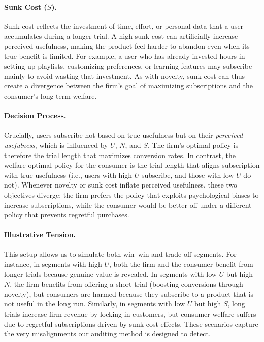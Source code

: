 \documentclass[11pt,letterpaper,english]{article}
\begin{document}
\paragraph{Sunk Cost ($S$).} Sunk cost reflects the investment of time, effort, or personal data that a user accumulates during a longer trial. A high sunk cost can artificially increase perceived usefulness, making the product feel harder to abandon even when its true benefit is limited. For example, a user who has already invested hours in setting up playlists, customizing preferences, or learning features may subscribe mainly to avoid wasting that investment. As with novelty, sunk cost can thus create a divergence between the firm’s goal of maximizing subscriptions and the consumer’s long-term welfare.

\paragraph{Decision Process.} Crucially, users subscribe not based on true usefulness but on their \emph{perceived usefulness}, which is influenced by $U$, $N$, and $S$. The firm’s optimal policy is therefore the trial length that maximizes conversion rates. In contrast, the welfare-optimal policy for the consumer is the trial length that aligns subscription with true usefulness (i.e., users with high $U$ subscribe, and those with low $U$ do not). Whenever novelty or sunk cost inflate perceived usefulness, these two objectives diverge: the firm prefers the policy that exploits psychological biases to increase subscriptions, while the consumer would be better off under a different policy that prevents regretful purchases.

\paragraph{Illustrative Tension.} This setup allows us to simulate both win--win and trade-off segments. For instance, in segments with high $U$, both the firm and the consumer benefit from longer trials because genuine value is revealed. In segments with low $U$ but high $N$, the firm benefits from offering a short trial (boosting conversions through novelty), but consumers are harmed because they subscribe to a product that is not useful in the long run. Similarly, in segments with low $U$ but high $S$, long trials increase firm revenue by locking in customers, but consumer welfare suffers due to regretful subscriptions driven by sunk cost effects. These scenarios capture the very misalignments our auditing method is designed to detect.
\end{document}
